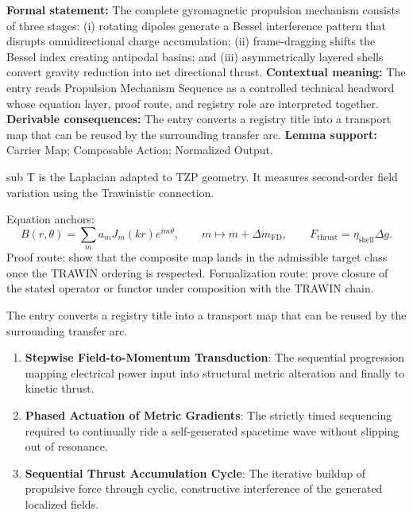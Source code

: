 \begingroup\footnotesize\setlength{\emergencystretch}{3em}\sloppy
\textbf{Formal statement:} The complete gyromagnetic propulsion mechanism consists of three stages: (i) rotating dipoles generate a Bessel interference pattern that disrupts omnidirectional charge accumulation; (ii) frame-dragging shifts the Bessel index creating antipodal basins; and (iii) asymmetrically layered shells convert gravity reduction into net directional thrust. \textbf{Contextual meaning:} The entry reads Propulsion Mechanism Sequence as a controlled technical headword whose equation layer, proof route, and registry role are interpreted together. \textbf{Derivable consequences:} The entry converts a registry title into a transport map that can be reused by the surrounding transfer arc. \textbf{Lemma support:} Carrier Map; Composable Action; Normalized Output.\par
\endgroup

sub T is the Laplacian adapted to TZP geometry. It measures second-order field variation using the Trawinistic connection.

Equation anchors:
\[
B(r,\theta)=\sum_m a_m J_m(kr)e^{im\theta},
\qquad
m\mapsto m+\Delta m_{\mathrm{FD}},
\qquad
F_{\mathrm{thrust}}=\eta_{\mathrm{shell}}\Delta g.
\]
Proof route: show that the composite map lands in the admissible target class once the TRAWIN ordering is respected. Formalization route: prove closure of the stated operator or functor under composition with the TRAWIN chain.

The entry converts a registry title into a transport map that can be reused by the surrounding transfer arc.
\endgroup

\begin{enumerate}[leftmargin=1.6em,itemsep=6pt,topsep=4pt]
\item \textbf{Stepwise Field-to-Momentum Transduction}: The sequential progression mapping electrical power input into structural metric alteration and finally to kinetic thrust.
\item \textbf{Phased Actuation of Metric Gradients}: The strictly timed sequencing required to continually ride a self-generated spacetime wave without slipping out of resonance.
\item \textbf{Sequential Thrust Accumulation Cycle}: The iterative buildup of propulsive force through cyclic, constructive interference of the generated localized fields.
\end{enumerate}

